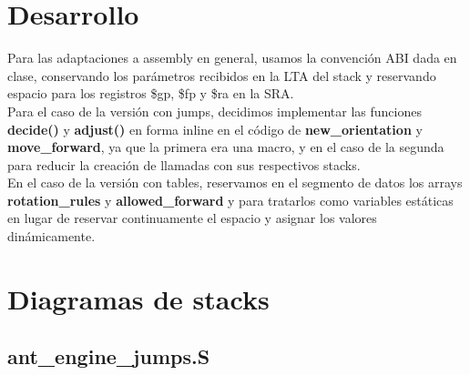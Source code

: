 \documentclass[a4paper, 10pt, twoside, notitlepage]{article}
\begin{document}
\newpage
\section{Desarrollo}
\normalsize
Para las adaptaciones a assembly en general, usamos la convención ABI dada en clase, conservando los parámetros recibidos en la LTA del stack y reservando espacio para los registros \$gp, \$fp y \$ra en la SRA.\\
Para el caso de la versión con jumps, decidimos implementar las funciones \textbf{decide()} y \textbf{adjust()} en forma inline en el código de \textbf{new\_orientation} y \textbf{move\_forward}, ya que la primera era una macro, y en el caso de la segunda para reducir la creación de llamadas con sus respectivos stacks.\\
En el caso de la versión con tables, reservamos en el segmento de datos los arrays \textbf{rotation\_rules} y \textbf{allowed\_forward} y para tratarlos como variables estáticas en lugar de reservar continuamente el espacio y asignar los valores dinámicamente.\\

\normalsize
\section{Diagramas de stacks}\label{sec:diagstacks}

\subsection{ant\_engine\_jumps.S}
\end{document}
